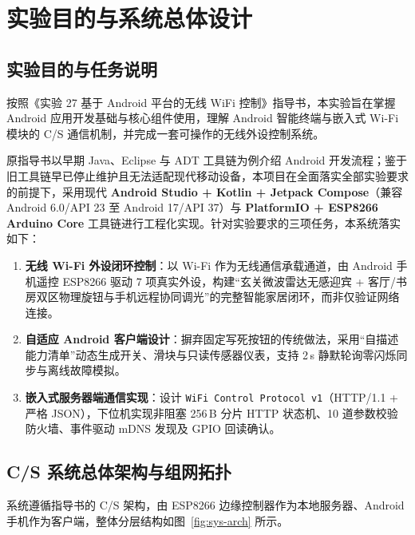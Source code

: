 \documentclass[10.5pt,a4paper]{ctexart}
\begin{document}
\clearpage
\thispagestyle{plain}
\renewcommand{\contentsname}{\fontsize{16pt}{20pt}\selectfont\bfseries 目\quad 录}
\tableofcontents

\clearpage
\section{实验目的与系统总体设计}

\subsection{实验目的与任务说明}
按照《实验 27 基于 Android 平台的无线 WiFi 控制》指导书，本实验旨在掌握 Android 应用开发基础与核心组件使用，理解 Android 智能终端与嵌入式 Wi-Fi 模块的 C/S 通信机制，并完成一套可操作的无线外设控制系统。

原指导书以早期 Java、Eclipse 与 ADT 工具链为例介绍 Android 开发流程；鉴于旧工具链早已停止维护且无法适配现代移动设备，本项目在全面落实全部实验要求的前提下，采用现代 \textbf{Android Studio + Kotlin + Jetpack Compose}（兼容 Android 6.0/API 23 至 Android 17/API 37）与 \textbf{PlatformIO + ESP8266 Arduino Core} 工具链进行工程化实现。针对实验要求的三项任务，本系统落实如下：
\begin{enumerate}
    \item \textbf{无线 Wi-Fi 外设闭环控制}：以 Wi-Fi 作为无线通信承载通道，由 Android 手机遥控 ESP8266 驱动 7 项真实外设，构建“玄关微波雷达无感迎宾 + 客厅/书房双区物理旋钮与手机远程协同调光”的完整智能家居闭环，而非仅验证网络连接。
    \item \textbf{自适应 Android 客户端设计}：摒弃固定写死按钮的传统做法，采用“自描述能力清单”动态生成开关、滑块与只读传感器仪表，支持 2\,s 静默轮询零闪烁同步与离线故障模拟。
    \item \textbf{嵌入式服务器端通信实现}：设计 \texttt{WiFi Control Protocol v1}（HTTP/1.1 + 严格 JSON），下位机实现非阻塞 256\,B 分片 HTTP 状态机、10 道参数校验防火墙、事件驱动 mDNS 发现及 GPIO 回读确认。
\end{enumerate}

\subsection{C/S 系统总体架构与组网拓扑}
系统遵循指导书的 C/S 架构，由 ESP8266 边缘控制器作为本地服务器、Android 手机作为客户端，整体分层结构如图~\ref{fig:sys-arch} 所示。
\end{document}
